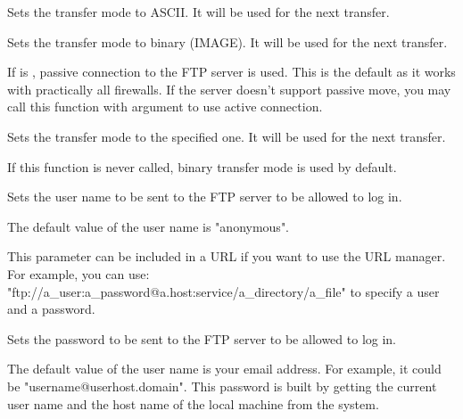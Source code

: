 Sets the transfer mode to ASCII. It will be used for the next transfer.




Sets the transfer mode to binary (IMAGE). It will be used for the next transfer.




If  is \true, passive connection to the FTP server is used. This is
the default as it works with practically all firewalls. If the server doesn't
support passive move, you may call this function with \false argument to use
active connection.




Sets the transfer mode to the specified one. It will be used for the next
transfer.

If this function is never called, binary transfer mode is used by default.





Sets the user name to be sent to the FTP server to be allowed to log in.


The default value of the user name is "anonymous".


This parameter can be included in a URL if you want to use the URL manager.
For example, you can use: "ftp://a\_user:a\_password@a.host:service/a\_directory/a\_file"
to specify a user and a password.




Sets the password to be sent to the FTP server to be allowed to log in.


The default value of the user name is your email address. For example, it could
be "username@userhost.domain". This password is built by getting the current
user name and the host name of the local machine from the system.


